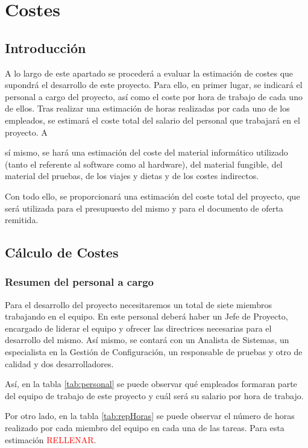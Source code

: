 \documentclass[10pt,a4paper,oldfontcommands]{plantillaDPDS}
\begin{document}
\pagecolor{fondo}
\color{principal}

\chapter{Costes}
\clearpage

\section{Introducción}
\par A lo largo de este apartado se procederá a evaluar la estimación de costes que supondrá el desarrollo de este proyecto. Para ello, en primer lugar, se indicará el personal a cargo del proyecto, así como el coste por hora de trabajo de cada uno de ellos. Tras realizar una estimación de horas realizadas por cada uno de los empleados, se estimará el coste total del salario del personal que trabajará en el proyecto.
A\par sí mismo, se hará una estimación del coste del material informático utilizado (tanto el referente al software como al hardware), del material fungible, del material del pruebas, de los viajes y dietas y de los costes indirectos.
\par Con todo ello, se proporcionará una estimación del coste total del proyecto, que será utilizada para el presupuesto del mismo y para el documento de oferta remitida.

\section{Cálculo de Costes}

\subsection{Resumen del personal a cargo}
\par Para el desarrollo del proyecto necesitaremos un total de siete miembros trabajando en el equipo. En este personal deberá haber un Jefe de Proyecto, encargado de liderar el equipo y ofrecer las directrices necesarias para el desarrollo del mismo. Así mismo, se contará con un Analista de Sistemas, un especialista en la Gestión de Configuración, un responsable de pruebas y otro de calidad y dos desarrolladores.
\par Así, en la tabla \ref{tab:personal} se puede observar qué empleados formaran parte del equipo de trabajo de este proyecto y cuál será su salario por hora de trabajo.
\par Por otro lado, en la tabla \ref{tab:repHoras} se puede observar el número de horas realizado por cada miembro del equipo en cada una de las tareas. Para esta estimación \textcolor{red}{RELLENAR}.
\end{document}
